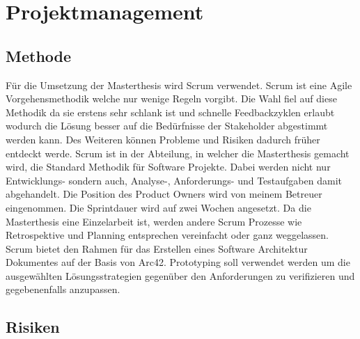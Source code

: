 \chapter{Projektmanagement}

\section{Methode}

Für die Umsetzung der Masterthesis wird Scrum verwendet. Scrum ist eine Agile Vorgehensmethodik welche nur wenige Regeln vorgibt. Die Wahl fiel auf diese Methodik da sie erstens sehr schlank ist und schnelle Feedbackzyklen erlaubt wodurch die Lösung besser auf die Bedürfnisse der Stakeholder abgestimmt werden kann. Des Weiteren können Probleme und Risiken dadurch früher entdeckt werde. Scrum ist in der Abteilung, in welcher die Masterthesis gemacht wird, die Standard Methodik für Software Projekte. Dabei werden nicht nur Entwicklungs- sondern auch, Analyse-, Anforderungs- und Testaufgaben damit abgehandelt. Die Position des Product Owners wird von meinem Betreuer eingenommen. Die Sprintdauer wird auf zwei Wochen angesetzt. Da die Masterthesis eine Einzelarbeit ist, werden andere Scrum Prozesse wie Retrospektive und Planning entsprechen vereinfacht oder ganz weggelassen. Scrum bietet den Rahmen für das Erstellen eines Software Architektur Dokumentes auf der Basis von Arc42.
Prototyping soll verwendet werden um die ausgewählten Lösungsstrategien gegenüber den Anforderungen zu verifizieren und gegebenenfalls anzupassen.  

\section{Risiken}

